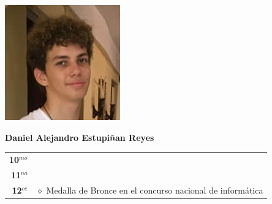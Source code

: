 \begin{minipage}{0.2\textwidth}
	\includegraphics[width=\linewidth]{img/concursantes/daniel.png} %
\end{minipage}
\hfill
\begin{minipage}{0.7\textwidth}
	\textbf{Daniel Alejandro Estupiñan Reyes}
	
	\vspace*{0.1in}
	\begin{tabular}{rl}
		
		\textbf{10$^{mo}$} &   \\
		
		\textbf{11$^{no}$} &  \\
		
		\textbf{12$^{ce}$} &  $\diamond$ Medalla de Bronce en el concurso nacional de informática \\
		
		
	\end{tabular}
\end{minipage}

